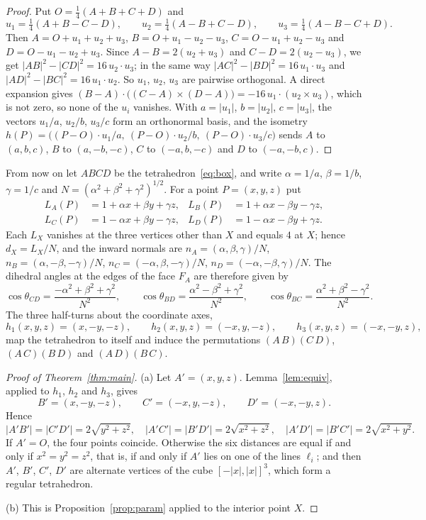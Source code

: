 \documentclass[11pt]{amsart}
\theoremstyle{definition}
\theoremstyle{remark}
\numberwithin{equation}{section}
\begin{document}
\begin{proof}
Put $O=\tfrac14(A+B+C+D)$ and
\[
u_1=\tfrac14(A+B-C-D),\qquad u_2=\tfrac14(A-B+C-D),\qquad u_3=\tfrac14(A-B-C+D).
\]
Then $A=O+u_1+u_2+u_3$, $B=O+u_1-u_2-u_3$, $C=O-u_1+u_2-u_3$ and $D=O-u_1-u_2+u_3$. Since $A-B=2(u_2+u_3)$ and $C-D=2(u_2-u_3)$, we get $|AB|^2-|CD|^2=16\,u_2\cdot u_3$; in the same way $|AC|^2-|BD|^2=16\,u_1\cdot u_3$ and $|AD|^2-|BC|^2=16\,u_1\cdot u_2$. So $u_1$, $u_2$, $u_3$ are pairwise orthogonal. A direct expansion gives $(B-A)\cdot\bigl((C-A)\times(D-A)\bigr)=-16\,u_1\cdot(u_2\times u_3)$, which is not zero, so none of the $u_i$ vanishes. With $a=|u_1|$, $b=|u_2|$, $c=|u_3|$, the vectors $u_1/a$, $u_2/b$, $u_3/c$ form an orthonormal basis, and the isometry $h(P)=\bigl((P-O)\cdot u_1/a,\ (P-O)\cdot u_2/b,\ (P-O)\cdot u_3/c\bigr)$ sends $A$ to $(a,b,c)$, $B$ to $(a,-b,-c)$, $C$ to $(-a,b,-c)$ and $D$ to $(-a,-b,c)$.
\end{proof}

From now on let $ABCD$ be the tetrahedron~\eqref{eq:box}, and write $\alpha=1/a$, $\beta=1/b$, $\gamma=1/c$ and $N=(\alpha^2+\beta^2+\gamma^2)^{1/2}$. For a point $P=(x,y,z)$ put
\begin{align*}
L_A(P)&=1+\alpha x+\beta y+\gamma z, & L_B(P)&=1+\alpha x-\beta y-\gamma z,\\
L_C(P)&=1-\alpha x+\beta y-\gamma z, & L_D(P)&=1-\alpha x-\beta y+\gamma z.
\end{align*}
Each $L_X$ vanishes at the three vertices other than $X$ and equals $4$ at $X$; hence $d_X=L_X/N$, and the inward normals are $n_A=(\alpha,\beta,\gamma)/N$, $n_B=(\alpha,-\beta,-\gamma)/N$, $n_C=(-\alpha,\beta,-\gamma)/N$, $n_D=(-\alpha,-\beta,\gamma)/N$. The dihedral angles at the edges of the face $F_A$ are therefore given by
\begin{equation}\label{eq:cos}
\cos\theta_{CD}=\frac{-\alpha^2+\beta^2+\gamma^2}{N^2},\qquad
\cos\theta_{BD}=\frac{\alpha^2-\beta^2+\gamma^2}{N^2},\qquad
\cos\theta_{BC}=\frac{\alpha^2+\beta^2-\gamma^2}{N^2}.
\end{equation}
The three half-turns about the coordinate axes,
\[
h_1(x,y,z)=(x,-y,-z),\qquad h_2(x,y,z)=(-x,y,-z),\qquad h_3(x,y,z)=(-x,-y,z),
\]
map the tetrahedron to itself and induce the permutations $(A\,B)(C\,D)$, $(A\,C)(B\,D)$ and $(A\,D)(B\,C)$.

\begin{proof}[Proof of Theorem~\ref{thm:main}]
(a) Let $A'=(x,y,z)$. Lemma~\ref{lem:equiv}, applied to $h_1$, $h_2$ and $h_3$, gives
\[
B'=(x,-y,-z),\qquad C'=(-x,y,-z),\qquad D'=(-x,-y,z).
\]
Hence
\[
|A'B'|=|C'D'|=2\sqrt{y^2+z^2},\quad |A'C'|=|B'D'|=2\sqrt{x^2+z^2},\quad |A'D'|=|B'C'|=2\sqrt{x^2+y^2}.
\]
If $A'=O$, the four points coincide. Otherwise the six distances are equal if and only if $x^2=y^2=z^2$, that is, if and only if $A'$ lies on one of the lines $\ell_i$; and then $A'$, $B'$, $C'$, $D'$ are alternate vertices of the cube $[-|x|,|x|]^3$, which form a regular tetrahedron.

(b) This is Proposition~\ref{prop:param} applied to the interior point $X$.
\end{proof}
\end{document}
